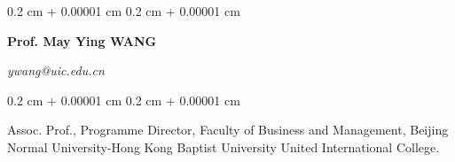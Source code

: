 \documentclass[10pt, letterpaper]{article}
\newenvironment{onecolentry}{
    \begin{adjustwidth}{
        0.2 cm + 0.00001 cm
    }{
        0.2 cm + 0.00001 cm
    }
}{
    \end{adjustwidth}
} %
\newenvironment{twocolentry}[2][]{
    \onecolentry
    \def\secondColumn{#2}
    \setcolumnwidth{\fill, 4.5 cm}
    \begin{paracol}{2}
}{
    \switchcolumn \raggedleft \secondColumn
    \end{paracol}
    \endonecolentry
} %
\begin{document}
        \vspace{0.2 cm}

        \begin{twocolentry}{
            \textit{ywang@uic.edu.cn}}
                \textbf{Prof. May Ying WANG}
        \end{twocolentry}
        \begin{onecolentry}
            Assoc. Prof., Programme Director, Faculty of Business and Management, Beijing Normal University-Hong Kong Baptist University United International College.
        \end{onecolentry}
\end{document}
